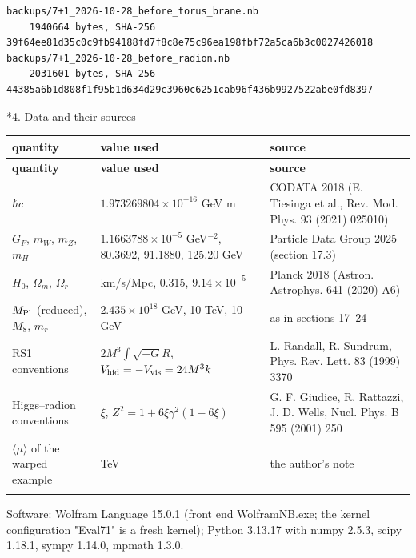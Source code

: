 \documentclass[10pt,a4paper]{article}
\makeatletter
\renewcommand\section{\@startsection{section}{1}{\z@}{-3.5ex \@plus -1ex \@minus -.2ex}{2.3ex \@plus.2ex}{\normalfont\Large\bfseries\raggedright}}
\makeatother
\begin{document}
\begin{Verbatim}[fontsize=\small,frame=single,framesep=2mm]
backups/7+1_2026-10-28_before_torus_brane.nb
    1940664 bytes, SHA-256 39f64ee81d35c0c9fb94188fd7f8c8e75c96ea198fbf72a5ca6b3c0027426018
backups/7+1_2026-10-28_before_radion.nb
    2031601 bytes, SHA-256 44385a6b1d808f1f95b1d634d29c3960c6251cab96f436b9927522abe0fd8397
\end{Verbatim}
\section*{4. Data and their sources}
{\footnotesize
\begin{longtable}{>{\raggedright\arraybackslash}p{}>{\raggedright\arraybackslash}p{}>{\raggedright\arraybackslash}p{}}
\toprule
\textbf{quantity} & \textbf{value used} & \textbf{source} \\
\midrule\endfirsthead
\toprule
\textbf{quantity} & \textbf{value used} & \textbf{source} \\
\midrule\endhead
\endfoot
\bottomrule\endlastfoot
$\hbar c$ & $1.973269804\times10^{-16}$ GeV m & CODATA 2018 (E. Tiesinga et al., Rev. Mod. Phys. 93 (2021) 025010) \\
$G_F$, $m_W$, $m_Z$, $m_H$ & $1.1663788\times10^{-5}$ GeV$^{-2}$, 80.3692, 91.1880, 125.20 GeV & Particle Data Group 2025 (section 17.3) \\
$H_0$, $\Omega_m$, $\Omega_r$ & 67.4 km/s/Mpc, 0.315, $9.14\times10^{-5}$ & Planck 2018 (Astron. Astrophys. 641 (2020) A6) \\
$M_{\rm Pl}$ (reduced), $M_8$, $m_r$ & $2.435\times10^{18}$ GeV, 10 TeV, 10 GeV & as in sections 17–24 \\
RS1 conventions & $2M^3\int\sqrt{-G}R$, $V_{\rm hid}=-V_{\rm vis}=24M^3k$ & L. Randall, R. Sundrum, Phys. Rev. Lett. 83 (1999) 3370 \\
Higgs–radion conventions & $\xi$, $Z^2=1+6\xi\gamma^2(1-6\xi)$ & G. F. Giudice, R. Rattazzi, J. D. Wells, Nucl. Phys. B 595 (2001) 250 \\
$\langle\mu\rangle$ of the warped example & 3 TeV & the author’s note \\*
\end{longtable}}
Software: Wolfram Language 15.0.1 (front end WolframNB.exe; the kernel configuration "Eval71" is a fresh kernel); Python 3.13.17 with numpy 2.5.3, scipy 1.18.1, sympy 1.14.0, mpmath 1.3.0.
\end{document}

